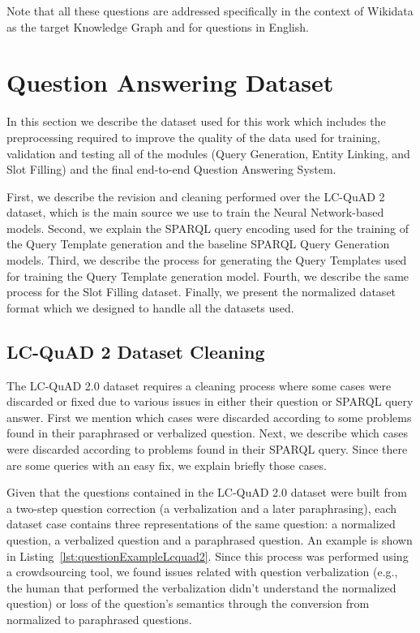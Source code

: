 Note that all these questions are addressed specifically in the context of Wikidata as 
the target Knowledge Graph and for questions in English.

\section{Question Answering Dataset}
\label{cap4:experimentalDesign/QaDataset}
In this section we describe the dataset used for this work which includes the preprocessing 
required to improve the quality of the data used for training, validation and testing all of 
the modules (Query Generation, Entity Linking, and Slot Filling) and the final end-to-end 
Question Answering System. 

First, we describe the revision and cleaning performed over the LC-QuAD 2 dataset, which is the 
main source we use to train the Neural Network-based models. Second, we explain the SPARQL query 
encoding used for the training of the Query Template generation and the baseline SPARQL Query 
Generation models. Third, we describe the process for generating the Query Templates used for 
training the Query Template generation model. Fourth, we describe the same process for the Slot 
Filling dataset. Finally, we present the normalized dataset format which we designed to handle 
all the datasets used.

\subsection{LC-QuAD 2 Dataset Cleaning}
\label{cap4:experimentalDesign/QaDataset/cleaning}
The LC-QuAD 2.0 dataset requires a cleaning process where some cases were discarded or fixed due 
to various issues in either their question or SPARQL query answer. First we mention which cases 
were discarded according to some problems found in their paraphrased or verbalized question. 
Next, we describe which cases were discarded according to problems found in their SPARQL query. 
Since there are some queries with an easy fix, we explain briefly those cases. 

Given that the questions contained in the LC-QuAD 2.0 dataset were built from a two-step 
question correction (a verbalization and a later paraphrasing), each dataset case contains 
three representations of the same question: a normalized question, a verbalized question and a 
paraphrased question. An example is shown in Listing~\ref{lst:questionExampleLcquad2}. Since 
this process was performed using a crowdsourcing tool, we found issues related with question 
verbalization (e.g., the human that performed the verbalization didn’t understand the normalized 
question) or loss of the question’s semantics through the conversion from normalized to 
paraphrased questions.

